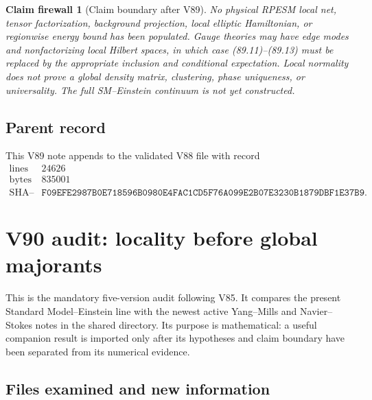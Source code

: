 \documentclass[11pt]{article}
\newtheorem{firewall}[theorem]{Claim firewall}
\theoremstyle{remark}
\begin{document}
\begin{firewall}[Claim boundary after V89]
\label{fire:v12v89-claim}
No physical RPESM local net, tensor factorization, background
projection, local elliptic Hamiltonian, or regionwise energy bound
has been populated.  Gauge theories may have edge modes and
nonfactorizing local Hilbert spaces, in which case (89.11)--(89.13)
must be replaced by the appropriate inclusion and conditional
expectation.  Local normality does not prove a global density matrix,
clustering, phase uniqueness, or universality.  The full
SM--Einstein continuum is not yet constructed.
\end{firewall}

\subsection{Parent record}

This V89 note appends to the validated V88 file with record
\[
\begin{array}{c|c}
\text{lines}&24626\\
\text{bytes}&835001\\
\text{SHA--256}&
\texttt{F09EFE2987B0E718596B0980E4FAC1CD5F76A099E2B07E3230B1879DBF1E37B9}.
\end{array}
\]




\section{V90 audit: locality before global majorants}
\label{sec:v12v90}

This is the mandatory five-version audit following V85.  It compares
the present Standard Model--Einstein line with the newest active
Yang--Mills and Navier--Stokes notes in the shared directory.  Its
purpose is mathematical: a useful companion result is imported only
after its hypotheses and claim boundary have been separated from its
numerical evidence.

\subsection{Files examined and new information}
\end{document}
